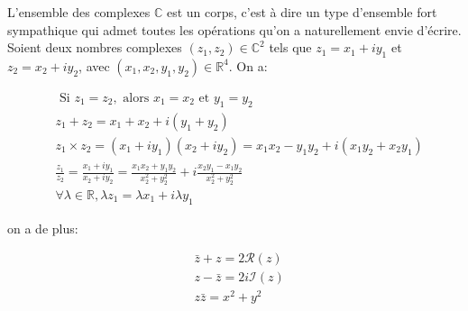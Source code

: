 \begin{figure}[H]
    \centering
\end{figure}

L'ensemble des complexes $\mathbb{C}$ est un corps, c'est à dire un type d'ensemble fort sympathique qui admet toutes les opérations qu'on a naturellement envie d'écrire. Soient deux nombres complexes $\left(z_1, z_2\right) \in \mathbb{C}^2$ tels que $z_1=x_1+i y_1$ et $z_2=x_2+i y_2$, avec $\left(x_1, x_2, y_1, y_2\right) \in \mathbb{R}^4$. On a:

\begin{align}
& \text { Si } z_1=z_2, \text { alors } x_{1}=x_{2} \text { et } y_{1}=y_{2} \\
& z_1+z_2=x_{1}+x_{2}+i\left(y_{1}+y_{2}\right) \\
& z_1 \times z_2=\left(x_{1}+i y_{1}\right)\left(x_{2}+i y_{2}\right)=x_{1} x_{2}-y_{1} y_{2}+i\left(x_{1} y_{2}+x_{2} y_{1}\right) \\
& \frac{z_1}{z_2}=\frac{x_{1}+i y_{1}}{x_{2}+i y_{2}}=\frac{x_{1} x_{2}+y_{1} y_{2}}{x_{2}^{2}+y_{2}^{2}}+i \frac{x_{2} y_{1}-x_{1} y_{2}}{x_{2}^{2}+y_{2}^{2}} \\
& \forall \lambda \in \mathbb{R}, \lambda z_1=\lambda x_{1}+i \lambda y_{1}
\end{align}

on a de plus:

\begin{align}
& \bar{z}+z=2 \mathcal{R}(z) \\
& z-\bar{z}=2 i \mathcal{I}(z) \\
& z \bar{z}=x^2+y^2
\end{align}


